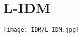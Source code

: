 \documentclass[../../DD.tex]{subfiles}
\begin{document}
\section{L-IDM \label{sect:2.1}}
	
	\texttt{[image: IDM/L-IDM.jpg]}
\end{document}
